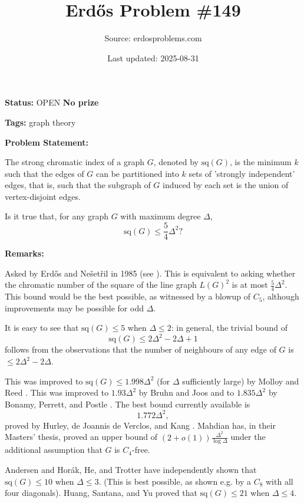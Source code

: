 \documentclass{article}
\title{Erd\H{o}s Problem \#149}
\date{Last updated: 2025-08-31}
\author{Source: erdosproblems.com}
\begin{document}
\maketitle

\noindent\textbf{Status:} OPEN \quad \textbf{No prize}

\noindent\textbf{Tags:} graph theory

\medskip
\noindent\textbf{Problem Statement:}

The strong chromatic index of a graph $G$, denoted by $\mathrm{sq}(G)$, is the minimum $k$ such that the edges of $G$ can be partitioned into $k$ sets of 'strongly independent' edges, that is, such that the subgraph of $G$ induced by each set is the union of vertex-disjoint edges.

Is it true that, for any graph $G$ with maximum degree $\Delta$,\[\mathrm{sq}(G)\leq\frac{5}{4}\Delta^2?\]

\bigskip
\noindent\textbf{Remarks:}

Asked by Erd\H{o}s and Ne\v{s}et\v{r}il in 1985 (see \cite{FGST89}). This is equivalent to asking whether the chromatic number of the square of the line graph $L(G)^2$ is at most $\frac{5}{4}\Delta^2$. This bound would be the best possible, as witnessed by a blowup of $C_5$, although improvements may be possible for odd $\Delta$.

It is easy to see that $\mathrm{sq}(G)\leq 5$ when $\Delta\leq 2$: in general, the trivial bound of\[\mathrm{sq}(G)\leq 2\Delta^2-2\Delta+1\]follows from the observations that the number of neighbours of any edge of $G$ is $\leq 2\Delta^2-2\Delta$.

This was improved to $\mathrm{sq}(G)\leq 1.998\Delta^2$ (for $\Delta$ sufficiently large) by Molloy and Reed \cite{MoRe97}. This was improved to $1.93\Delta^2$ by Bruhn and Joos \cite{BrJo18} and to $1.835\Delta^2$ by Bonamy, Perrett, and Postle \cite{BPP22}. The best bound currently available is\[1.772\Delta^2,\]proved by Hurley, de Joannis de Verclos, and Kang \cite{HJK22}. Mahdian has, in their Masters' thesis, proved an upper bound of $(2+o(1))\frac{\Delta^2}{\log \Delta}$ under the additional assumption that $G$ is $C_4$-free.

Andersen \cite{92} and Hor\'{a}k, He, and Trotter \cite{HHT93} have independently shown that $\mathrm{sq}(G)\leq 10$ when $\Delta\leq 3$. (This is best possible, as shown e.g. by a $C_8$ with all four diagonals). Huang, Santana, and Yu \cite{HSY18} proved that $\mathrm{sq}(G)\leq 21$ when $\Delta\leq 4$.
\end{document}
